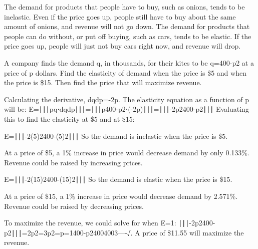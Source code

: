 The demand for products that people have to buy, such as onions, tends to be inelastic. Even if the price goes up, people still have to buy about the same amount of onions, and revenue will not go down. The demand for products that people can do without, or put off buying, such as cars, tends to be elastic. If the price goes up, people will just not buy cars right now, and revenue will drop.

\begin{example}
A company finds the demand q, in thousands, for their kites to be q=400-p2 at a price of p dollars. Find the elasticity of demand when the price is \$5 and when the price is \$15. Then find the price that will maximize revenue.

\begin{solution} Calculating the derivative, dqdp=-2p. The elasticity equation as a function of p will be:
E=∣∣∣pq⋅dqdp∣∣∣=∣∣∣p400-p2⋅(-2p)∣∣∣=∣∣∣-2p2400-p2∣∣∣
Evaluating this to find the elasticity at \$5 and at \$15:

E=∣∣∣-2(5)2400-(5)2∣∣∣
So the demand is inelastic when the price is \$5.

At a price of \$5, a 1\% increase in price would decrease demand by only 0.133\%. Revenue could be raised by increasing prices.

E=∣∣∣-2(15)2400-(15)2∣∣∣
So the demand is elastic when the price is \$15.

At a price of \$15, a 1\% increase in price would decrease demand by 2.571\%. Revenue could be raised by decreasing prices.

To maximize the revenue, we could solve for when E=1:
∣∣∣-2p2400-p2∣∣∣=2p2=3p2=p=1400-p24004003----√.
A price of \$11.55 will maximize the revenue.
\end{solution}\end{example}
